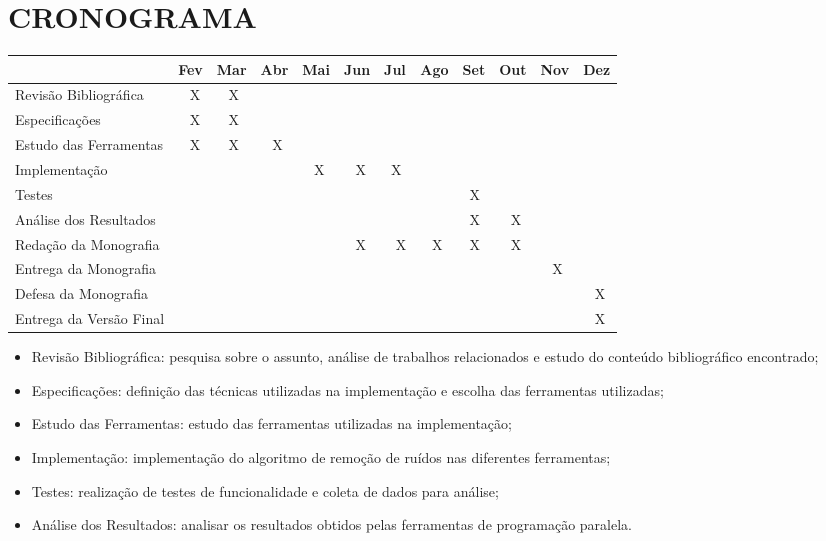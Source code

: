 
\chapter{CRONOGRAMA}
\label{chap:cronograma}

\begin{table}[H]
\centering
\begin{tabular}{|l|l|l|l|l|l|l|l|l|l|l|l|} 
\hline
                        & Fev & Mar & Abr & Mai & Jun & Jul & Ago & Set & Out & Nov & Dez  \\ 
\hline
Revisão Bibliográfica   & ~ X & ~ X & ~~  &     &     &     &     &     &     &     &      \\ 
\hline
Especificações          & ~ X & ~ X & ~~  &     &     &     &     &     &     &     &      \\ 
\hline
Estudo das Ferramentas   & ~ X & ~ X & ~ X &     &     &     &    &     &     &     &      \\ 
\hline
Implementação           &     &     &     & ~ X & ~ X & ~X  &     &     &     &     &      \\ 
\hline
Testes                  &     &     &     &     &     &     &     & ~X  & ~~  &     &      \\ 
\hline
Análise dos Resultados  &     &     &     &     &     &     &     & ~X  & ~ X &     &      \\ 
\hline
Redação da Monografia   &     &     &     &     & ~ X & ~ X & ~ X & ~X  & ~ X &     &      \\ 
\hline
Entrega da Monografia   &     &     &     &     &     &     &     &     &     & ~ X &      \\ 
\hline
Defesa da Monografia    &     &     &     &     &     &     &     &     &     &     & ~ X  \\ 
\hline
Entrega da Versão Final &     &     &     &     &     &     &     &     &     &     & ~ X  \\
\hline
\end{tabular}
\end{table}

\begin{itemize}
    \item Revisão Bibliográfica: pesquisa sobre o assunto, análise de trabalhos relacionados e
estudo do conteúdo bibliográfico encontrado;
    \item Especificações: definição das técnicas utilizadas na implementação e escolha das
ferramentas utilizadas;
    \item Estudo das Ferramentas: estudo das ferramentas utilizadas na implementação;
    \item Implementação: implementação do algoritmo de remoção de ruídos nas diferentes
ferramentas;
    \item Testes: realização de testes de funcionalidade e coleta de dados para análise;
    \item Análise dos Resultados: analisar os resultados obtidos pelas ferramentas de
programação paralela.
\end{itemize}
